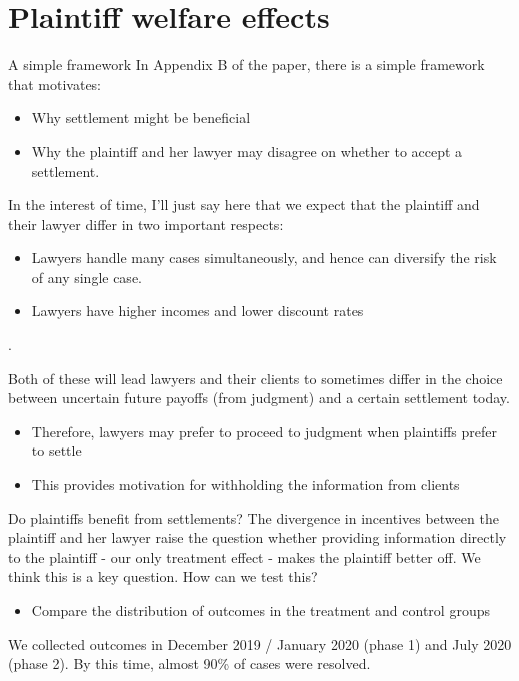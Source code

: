 \documentclass[9pt]{beamer}
\begin{document}
\section{Plaintiff welfare effects}
\begin{frame}{A simple framework}
    In Appendix B of the paper, there is a simple framework that motivates:
    \begin{itemize}
        \item Why settlement might be beneficial
        \item Why the plaintiff and her lawyer may disagree on whether to accept a settlement.
    \end{itemize}
    In the interest of time, I'll just say here that we expect that the plaintiff and their lawyer differ in two important respects:
    \begin{itemize}
        \item Lawyers handle many cases simultaneously, and hence can diversify the risk of any single case.
        \item Lawyers have higher incomes and lower discount rates
    \end{itemize}. 
    \vspace{2mm}
    
    Both of these will lead lawyers and their clients to sometimes differ in the choice between uncertain future payoffs (from judgment) and a certain settlement today.
    \begin{itemize}
        \item Therefore, lawyers may prefer to proceed to judgment when plaintiffs prefer to settle
        \item This provides motivation for withholding the information from clients
    \end{itemize}
\end{frame}




\begin{frame}{Do plaintiffs benefit from settlements?}
    The divergence in incentives between the plaintiff and her lawyer raise the question whether providing information directly to the plaintiff  - our only treatment effect - makes the plaintiff better off.  We think this is a key question. How can we test this?
    \begin{itemize}
        \item Compare the distribution of outcomes in the treatment and control groups
    \end{itemize}
    \vspace{2mm}
    
    We collected outcomes in December 2019 / January 2020 (phase 1) and July 2020 (phase 2). By this time, almost 90\% of cases were resolved.
    
\end{frame}
\end{document}
